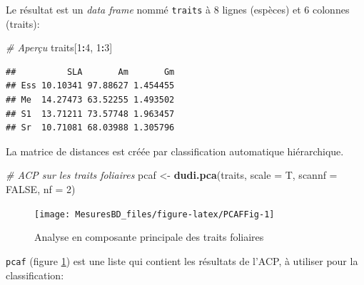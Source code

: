 \documentclass[
  11pt,
  french,
  a4paper,
  extrafontsizes,onecolumn,openright
  ]{memoir}
\newenvironment{Shaded}{\begin{snugshade}}{\end{snugshade}}
\newcommand{\CommentTok}[1]{\textcolor[rgb]{0.56,0.35,0.01}{\textit{#1}}}
\newcommand{\DataTypeTok}[1]{\textcolor[rgb]{0.13,0.29,0.53}{#1}}
\newcommand{\DecValTok}[1]{\textcolor[rgb]{0.00,0.00,0.81}{#1}}
\newcommand{\KeywordTok}[1]{\textcolor[rgb]{0.13,0.29,0.53}{\textbf{#1}}}
\newcommand{\NormalTok}[1]{#1}
\newcommand{\OperatorTok}[1]{\textcolor[rgb]{0.81,0.36,0.00}{\textbf{#1}}}
\newcommand{\OtherTok}[1]{\textcolor[rgb]{0.56,0.35,0.01}{#1}}
\newcommand{\StringTok}[1]{\textcolor[rgb]{0.31,0.60,0.02}{#1}}
\begin{document}
\normalsize

Le résultat est un \emph{data frame} nommé \texttt{traits} à 8 lignes (espèces) et 6 colonnes (traits):

\scriptsize

\begin{Shaded}
\begin{Highlighting}[]
\CommentTok{# Aperçu}
\NormalTok{traits[}\DecValTok{1}\OperatorTok{:}\DecValTok{4}\NormalTok{, }\DecValTok{1}\OperatorTok{:}\DecValTok{3}\NormalTok{]}
\end{Highlighting}
\end{Shaded}

\begin{verbatim}
##          SLA       Am       Gm
## Ess 10.10341 97.88627 1.454455
## Me  14.27473 63.52255 1.493502
## S1  13.71211 73.57748 1.963457
## Sr  10.71081 68.03988 1.305796
\end{verbatim}

\normalsize

La matrice de distances est créée par classification automatique hiérarchique.

\scriptsize

\begin{Shaded}
\begin{Highlighting}[]
\CommentTok{# ACP sur les traits foliaires}
\NormalTok{pcaf <-}\StringTok{ }\KeywordTok{dudi.pca}\NormalTok{(traits, }\DataTypeTok{scale =}\NormalTok{ T, }\DataTypeTok{scannf =} \OtherTok{FALSE}\NormalTok{, }\DataTypeTok{nf =} \DecValTok{2}\NormalTok{)}
\end{Highlighting}
\end{Shaded}

\normalsize

\scriptsize

\begin{figure}

{\centering \texttt{[image: MesuresBD\_files/figure-latex/PCAFFig-1]} 

}

\caption{Analyse en composante principale des traits foliaires}\label{fig:PCAFFig}
\end{figure}

\normalsize

\texttt{pcaf} (figure \ref{fig:PCAFFig}) est une liste qui contient les résultats de l'ACP, à utiliser pour la classification:

\scriptsize

\begin{Shaded}
\end{Shaded}
\end{document}
